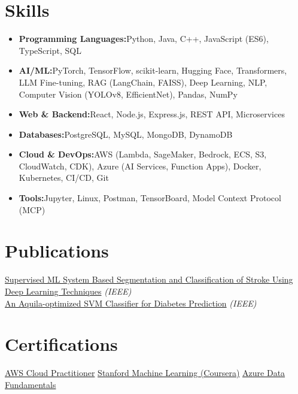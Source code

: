 \documentclass[a4paper,10pt]{article}
\newcommand{\resumeItem}[2]{\item{\textbf{#1}{\hspace{0.5mm}#2 \vspace{-0.5mm}}}}
\newcommand{\resumeSubItem}[2]{\resumeItem{#1}{#2}\vspace{-3pt}}
\newcommand{\resumeHeadingSkillStart}{\begin{itemize}[leftmargin=*, itemsep=0.6mm, rightmargin=2ex]}
\newcommand{\resumeHeadingSkillEnd}{\end{itemize}\vspace{-2mm}}
\begin{document}
\section{\textbf{Skills}}
\resumeHeadingSkillStart
\resumeSubItem{Programming Languages:}{Python, Java, C++, JavaScript (ES6), TypeScript, SQL}
\resumeSubItem{AI/ML:}{PyTorch, TensorFlow, scikit-learn, Hugging Face, Transformers, LLM Fine-tuning, RAG (LangChain, FAISS), Deep Learning, NLP, Computer Vision (YOLOv8, EfficientNet), Pandas, NumPy}
\resumeSubItem{Web \& Backend:}{React, Node.js, Express.js, REST API, Microservices}
\resumeSubItem{Databases:}{PostgreSQL, MySQL, MongoDB, DynamoDB}
\resumeSubItem{Cloud \& DevOps:}{AWS (Lambda, SageMaker, Bedrock, ECS, S3, CloudWatch, CDK), Azure (AI Services, Function Apps), Docker, Kubernetes, CI/CD, Git}
\resumeSubItem{Tools:}{Jupyter, Linux, Postman, TensorBoard, Model Context Protocol (MCP)}
\resumeHeadingSkillEnd
\vspace{0mm}

\section{\textbf{Publications}}
\footnotesize{
\href{https://ieeexplore.ieee.org/document/9792818}{Supervised ML System Based Segmentation and Classification of Stroke Using Deep Learning Techniques} \textit{(IEEE)} \\
\href{https://ieeexplore.ieee.org/document/10060334}{An Aquila-optimized SVM Classifier for Diabetes Prediction} \textit{(IEEE)}
}
\vspace{-3mm}

\section{\textbf{Certifications}}
\footnotesize{
\href{https://drive.google.com/file/d/1a3exoiS79RS3q8vSJHT-PpkczSPg54EZ/view}{AWS Cloud Practitioner} \hfill \href{https://drive.google.com/file/d/1At3BLkqJ9vuhPPUCcrNAw9yNH5li7XdQ/view}{Stanford Machine Learning (Coursera)} \hfill \href{https://drive.google.com/file/d/1VBJjfRMsIm8BckoUtLUV7ZbY88Jju2qT/view}{Azure Data Fundamentals}
}
\end{document}
